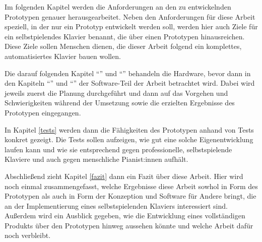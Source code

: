 Im folgenden Kapitel werden die Anforderungen an den zu entwickelnden Prototypen genauer herausgearbeitet.
Neben den Anforderungen für diese Arbeit speziell, in der nur ein Prototyp entwickelt werden soll, werden hier auch Ziele für ein selbstpielendes Klavier benannt, die über einen Prototypen hinausreichen.
Diese Ziele sollen Menschen dienen, die dieser Arbeit folgend ein komplettes, automatisiertes Klavier bauen wollen.

Die darauf folgenden Kapitel \enquote{} und \enquote{} behandeln die Hardware, bevor dann in den Kapiteln \enquote{} und \enquote{} der Software-Teil der Arbeit betrachtet wird.
Dabei wird jeweils zuerst die Planung durchgeführt und dann auf das Vorgehen und Schwierigkeiten während der Umsetzung sowie die erzielten Ergebnisse des Prototypen eingegangen.

In Kapitel \ref{tests} werden dann die Fähigkeiten des Prototypen anhand von Tests konkret gezeigt.
Die Tests sollen aufzeigen, wie gut eine solche Eigenentwicklung laufen kann und wie sie entsprechend gegen professionelle, selbstspielende Klaviere und auch gegen menschliche Pianist:innen aufhält. %

Abschließend zieht Kapitel \ref{fazit} dann ein Fazit über diese Arbeit.
Hier wird noch einmal zusammengefasst, welche Ergebnisse diese Arbeit sowhol in Form des Prototypen als auch in Form der Konzeption und Software für Andere bringt, die an der Implementierung eines selbstspielenden Klaviers interessiert sind.
Außerdem wird ein Ausblick gegeben, wie die Entwicklung eines vollständigen Produkts über den Prototypen hinweg aussehen könnte und welche Arbeit dafür noch verbleibt.
